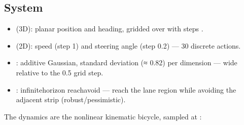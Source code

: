 \documentclass[a4paper,10pt,english]{sphinxmanual}
\begin{document}
\subsection{System}
\label{\detokenize{benchmarks/AV_minimal:system}}\begin{itemize}
\item {} 
\sphinxAtStartPar
{} (3D): planar position and heading, gridded over
 with steps .

\item {} 
\sphinxAtStartPar
{} (2D): speed \sphinxcode{\sphinxupquote{{[}\sphinxhyphen{}1,4{]}}} (step 1) and steering angle \sphinxcode{\sphinxupquote{{[}\sphinxhyphen{}0.4,0.4{]}}} (step 0.2)
— 30 discrete actions.

\item {} 
\sphinxAtStartPar
{}: additive Gaussian, standard deviation  (≈ 0.82) per
dimension — wide relative to the 0.5 grid step.

\item {} 
\sphinxAtStartPar
{}: infinite\sphinxhyphen{}horizon reach\sphinxhyphen{}avoid — reach the lane region
 while avoiding the adjacent strip
 (robust/pessimistic).

\end{itemize}

\sphinxAtStartPar
The dynamics are the nonlinear kinematic bicycle, sampled at :
\end{document}
